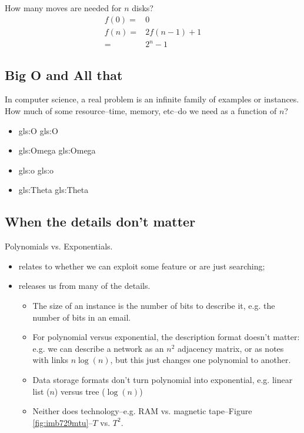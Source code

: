 \documentclass[]{article}
\begin{document}
How many moves are needed for $n$ disks?
\begin{align*}
	f(0) =& 0 \\
	f(n) =& 2f(n-1) + 1\\
	=& 2^n -1
\end{align*}

\subsection{Big O and All that}

In computer science, a real problem is an infinite family of examples or instances. How much of some resource--time, memory, etc--do we need as a function of $n$?

\begin{itemize}
	\item \gls{gls:O} \glsdesc{gls:O}
	\item \gls{gls:Omega} \glsdesc{gls:Omega}
	\item \gls{gls:o} \glsdesc{gls:o}
	\item \gls{gls:Theta} \glsdesc{gls:Theta}
\end{itemize}

\subsection{When the details don't matter}

Polynomials vs. Exponentials.

\begin{itemize}
	\item relates to whether we can exploit some feature or are just searching;
	\item releases us from many of the details.
	\begin{itemize}
		\item The size of an instance is the number of bits to describe it, e.g. the number of bits in an email.
		\item For polynomial versus exponential, the description format doesn't matter: e.g. we can describe a network as an $n^2$ adjacency matrix, or as notes with links $n\log(n)$, but this just changes one polynomial to another.
		\item Data storage formats don't turn polynomial into exponential, e.g. linear list ($n$) versus tree ($\log(n)$) 
		\item Neither does technology--e.g. RAM vs. magnetic tape--Figure \ref{fig:imb729mtu}--$T$ vs. $T^2$.
	\end{itemize}
\end{itemize}
\end{document}
